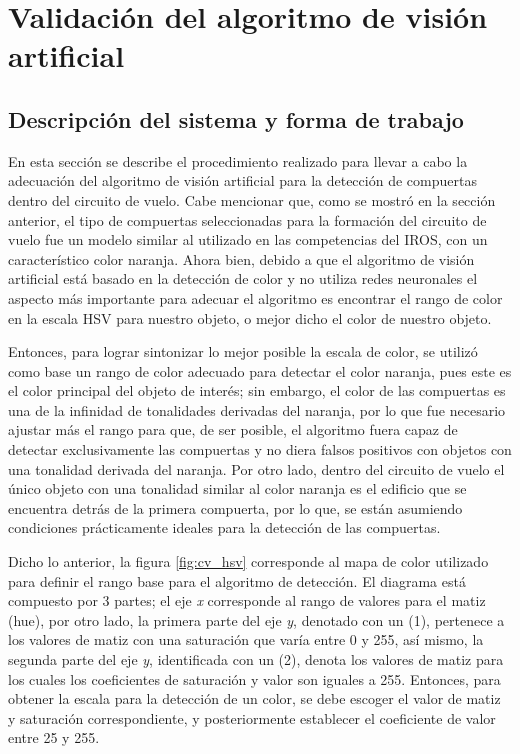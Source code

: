 \chapter{Validación del algoritmo de visión artificial}


\section{Descripción del sistema y forma de trabajo}
En esta sección se describe el procedimiento realizado para llevar a cabo la adecuación del algoritmo de visión artificial para la detección de compuertas dentro del circuito de vuelo. Cabe mencionar que, como se mostró en la sección anterior, el tipo de compuertas seleccionadas para la formación del circuito de vuelo fue un modelo similar al utilizado en las competencias del IROS, con un característico color naranja. Ahora bien, debido a que el algoritmo de visión artificial está basado en la detección de color y no utiliza redes neuronales el aspecto más importante para adecuar el algoritmo es encontrar el rango de color en la escala HSV para nuestro objeto, o mejor dicho el color de nuestro objeto.

Entonces, para lograr sintonizar lo mejor posible la escala de color, se utilizó como base un rango de color adecuado para detectar el color naranja, pues este es el color principal del objeto de interés; sin embargo, el color de las compuertas es una de la infinidad de tonalidades derivadas del naranja, por lo que fue necesario ajustar más el rango para que, de ser posible, el algoritmo fuera capaz de detectar exclusivamente las compuertas y no diera falsos positivos con objetos con una tonalidad derivada del naranja. Por otro lado, dentro del circuito de vuelo el único objeto con una tonalidad similar al color naranja es el edificio que se encuentra detrás de la primera compuerta, por lo que, se están asumiendo condiciones prácticamente ideales para la detección de las compuertas.

Dicho lo anterior, la figura \ref{fig:cv_hsv} corresponde al mapa de color utilizado para definir el rango base para el algoritmo de detección. El diagrama está compuesto por 3 partes; el eje \textit{x} corresponde al rango de valores para el matiz (hue), por otro lado, la primera parte del eje \textit{y}, denotado con un (1), pertenece a los valores de matiz con una saturación que varía entre 0 y 255, así mismo, la segunda parte del eje \textit{y}, identificada con un (2), denota los valores de matiz para los cuales los coeficientes de saturación y valor son iguales a 255. Entonces, para obtener la escala para la detección de un color, se debe escoger el valor de matiz y saturación correspondiente, y posteriormente establecer el coeficiente de valor entre 25 y 255.

